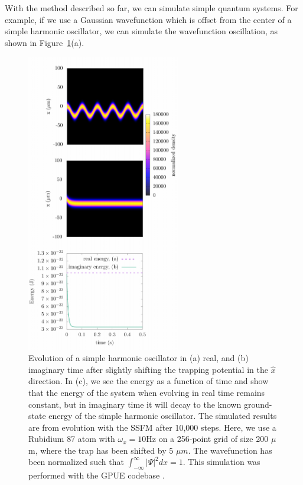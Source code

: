 With the method described so far, we can simulate simple quantum systems.
For example, if we use a Gaussian wavefunction which is offset from the center of a simple harmonic oscillator, we can simulate the wavefunction oscillation, as shown in Figure~\ref{fig:evolve}(a).

\begin{figure}

\center \includegraphics[width=0.6\textwidth]{data/splitop/SHO/SHO_gimp.pdf}

\caption{Evolution of a simple harmonic oscillator in (a) real, and (b) imaginary time after slightly shifting the trapping potential in the $\hat x$ direction.
In (c), we see the energy as a function of time and show that the energy of the system when evolving in real time remains constant, but in imaginary time it will decay to the known ground-state energy of the simple harmonic oscillator.
The simulated results are from evolution with the SSFM after 10,000 steps.
Here, we use a Rubidium 87 atom with $\omega_x = 10$Hz on a 256-point grid of size 200 $\mu$m, where the trap has been shifted by 5 $\mu m$.
The wavefunction has been normalized such that $\int_{-\infty}^\infty|\Psi|^2 dx = 1$.
This simulation was performed with the GPUE codebase \cite{schloss2018}.
}
\label{fig:evolve}
\end{figure}

